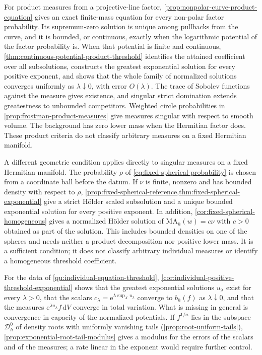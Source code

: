 For product measures from a projective-line factor, \cref{prop:nonpolar-curve-product-equation} gives an exact finite-mass equation for every non-polar factor probability. Its supremum-zero solution is unique among pullbacks from the curve, and it is bounded, or continuous, exactly when the logarithmic potential of the factor probability is. When that potential is finite and continuous, \cref{thm:continuous-potential-product-threshold} identifies the attained coefficient over all subsolutions, constructs the greatest exponential solution for every positive exponent, and shows that the whole family of normalized solutions converges uniformly as $\lambda\downarrow0$, with error $O(\lambda)$. The trace of Sobolev functions against the measure gives existence, and singular strict domination extends greatestness to unbounded competitors. Weighted circle probabilities in \cref{prop:frostman-product-measures} give measures singular with respect to smooth volume. The background has zero lower mass when the Hermitian factor does. These product criteria do not classify arbitrary measures on a fixed Hermitian manifold.

A different geometric condition applies directly to singular measures on a fixed Hermitian manifold. The probability $\rho$ of \eqref{eq:fixed-spherical-probability} is chosen from a coordinate ball before the datum. If $\nu$ is finite, nonzero and has bounded density with respect to $\rho$, \cref{prop:fixed-spherical-reference,thm:fixed-spherical-exponential} give a strict H\"older scaled subsolution and a unique bounded exponential solution for every positive exponent. In addition, \cref{cor:fixed-spherical-homogeneous} gives a normalized H\"older solution of $\mathrm{MA}_h(w)=c\nu$ with $c>0$ obtained as part of the solution. This includes bounded densities on one of the spheres and needs neither a product decomposition nor positive lower mass. It is a sufficient condition; it does not classify arbitrary individual measures or identify a homogeneous threshold coefficient.

For the data of \cref{qu:individual-equation-threshold}, \cref{cor:individual-positive-threshold-exponential} shows that the greatest exponential solutions $u_\lambda$ exist for every $\lambda>0$, that the scalars $c_\lambda=\mathrm{e}^{\lambda\sup_Xu_\lambda}$ converge to $b_h(f)$ as $\lambda\downarrow0$, and that the measures $\mathrm{e}^{\lambda u_\lambda}f\,\mathrm{d}V$ converge in total variation. What is missing in general is convergence in capacity of the normalized potentials. If $f^{1/n}$ lies in the subspace $\mathcal D_h^0$ of density roots with uniformly vanishing tails (\cref{prop:root-uniform-tails}), \cref{prop:exponential-root-tail-modulus} gives a modulus for the errors of the scalars and of the measures; a rate linear in the exponent would require further control.

